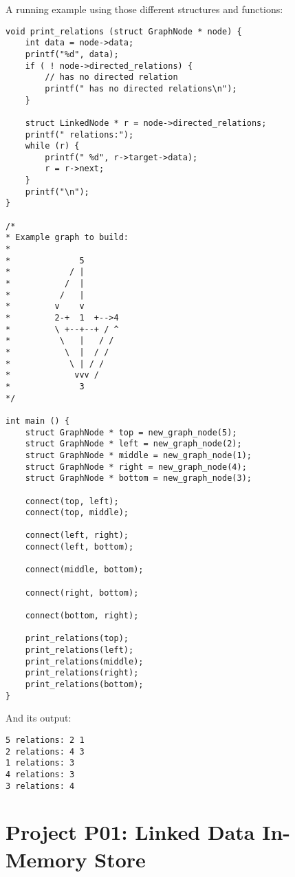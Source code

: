 A running example using those different structures and functions:
\begin{lstlisting}
void print_relations (struct GraphNode * node) {
    int data = node->data;
    printf("%d", data);
    if ( ! node->directed_relations) {
        // has no directed relation
        printf(" has no directed relations\n");
    }

    struct LinkedNode * r = node->directed_relations;
    printf(" relations:");
    while (r) {
        printf(" %d", r->target->data);
        r = r->next;
    }
    printf("\n");
}

/*
* Example graph to build:
*
*              5
*            / |
*           /  |
*          /   |
*         v    v
*         2-+  1  +-->4
*         \ +--+--+ / ^
*          \   |   / /
*           \  |  / /
*            \ | / /
*             vvv /
*              3
*/

int main () {
    struct GraphNode * top = new_graph_node(5);
    struct GraphNode * left = new_graph_node(2);
    struct GraphNode * middle = new_graph_node(1);
    struct GraphNode * right = new_graph_node(4);
    struct GraphNode * bottom = new_graph_node(3);

    connect(top, left);
    connect(top, middle);

    connect(left, right);
    connect(left, bottom);

    connect(middle, bottom);

    connect(right, bottom);

    connect(bottom, right);

    print_relations(top);
    print_relations(left);
    print_relations(middle);
    print_relations(right);
    print_relations(bottom);
}
\end{lstlisting}

And its output:

\begin{lstlisting}[language={}]
5 relations: 2 1
2 relations: 4 3
1 relations: 3
4 relations: 3
3 relations: 4
\end{lstlisting}



%
%
\bigskip
\bigskip
\section{Project P01: Linked Data In-Memory Store}



